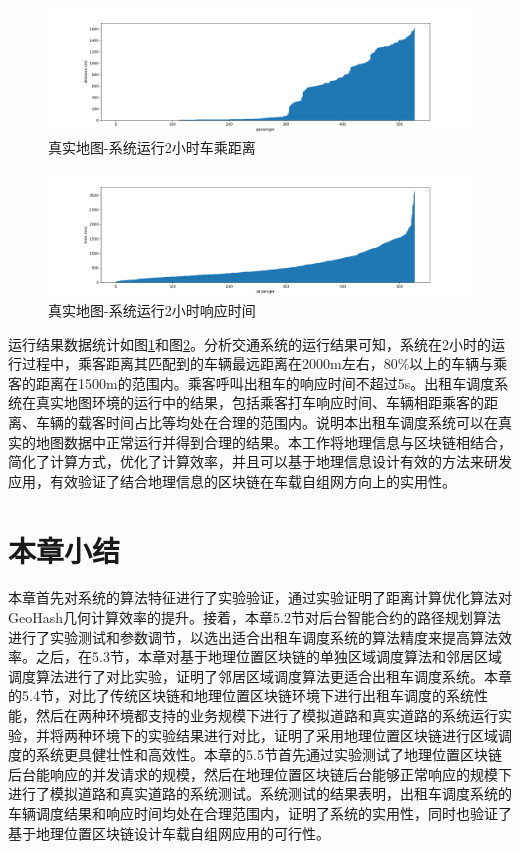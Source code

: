 \begin{figure}[h]
  \centering
  \includegraphics[width=1.0\textwidth]{figures/real_2hDistance}
  \caption{真实地图-系统运行2小时车乘距离}\label{fig:real_2hDistance}
\end{figure}

\begin{figure}[h]
  \centering
  \includegraphics[width=1.0\textwidth]{figures/real_2hTime}
  \caption{真实地图-系统运行2小时响应时间}\label{fig:real_2hTime}
\end{figure}

运行结果数据统计如图\ref{fig:real_2hDistance}和图\ref{fig:real_2hTime}。分析交通系统的运行结果可知，系统在2小时的运行过程中，乘客距离其匹配到的车辆最远距离在2000m左右，80$\%$以上的车辆与乘客的距离在1500m的范围内。乘客呼叫出租车的响应时间不超过5s。出租车调度系统在真实地图环境的运行中的结果，包括乘客打车响应时间、车辆相距乘客的距离、车辆的载客时间占比等均处在合理的范围内。说明本出租车调度系统可以在真实的地图数据中正常运行并得到合理的结果。本工作将地理信息与区块链相结合，简化了计算方式，优化了计算效率，并且可以基于地理信息设计有效的方法来研发应用，有效验证了结合地理信息的区块链在车载自组网方向上的实用性。

\section{本章小结}
本章首先对系统的算法特征进行了实验验证，通过实验证明了距离计算优化算法对GeoHash几何计算效率的提升。接着，本章5.2节对后台智能合约的路径规划算法进行了实验测试和参数调节，以选出适合出租车调度系统的算法精度来提高算法效率。之后，在5.3节，本章对基于地理位置区块链的单独区域调度算法和邻居区域调度算法进行了对比实验，证明了邻居区域调度算法更适合出租车调度系统。本章的5.4节，对比了传统区块链和地理位置区块链环境下进行出租车调度的系统性能，然后在两种环境都支持的业务规模下进行了模拟道路和真实道路的系统运行实验，并将两种环境下的实验结果进行对比，证明了采用地理位置区块链进行区域调度的系统更具健壮性和高效性。本章的5.5节首先通过实验测试了地理位置区块链后台能响应的并发请求的规模，然后在地理位置区块链后台能够正常响应的规模下进行了模拟道路和真实道路的系统测试。系统测试的结果表明，出租车调度系统的车辆调度结果和响应时间均处在合理范围内，证明了系统的实用性，同时也验证了基于地理位置区块链设计车载自组网应用的可行性。
